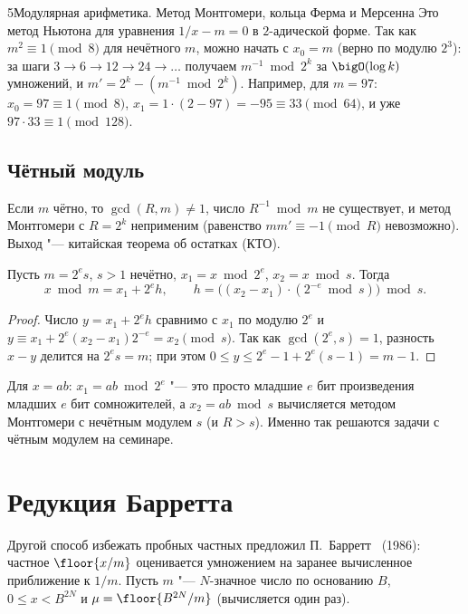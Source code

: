 \begin{lecture}{5}{Модулярная арифметика. Метод Монтгомери, кольца Ферма и Мерсенна}
Это метод Ньютона для уравнения $1/x - m = 0$ в $2$-адической форме. Так как $m^2 \equiv 1
\pmod 8$ для нечётного $m$, можно начать с $x_0 = m$ (верно по модулю $2^3$): за шаги
$3 \to 6 \to 12 \to 24 \to \dots$ получаем $m^{-1} \bmod 2^k$ за $\bigO(\log k)$ умножений, и
$m' = 2^k - (m^{-1} \bmod 2^k)$. Например, для $m = 97$: $x_0 = 97 \equiv 1 \pmod 8$,
$x_1 = 1 \cdot (2 - 97) = -95 \equiv 33 \pmod{64}$, и уже $97 \cdot 33 \equiv 1 \pmod{128}$.

\subsection{Чётный модуль}

Если $m$ чётно, то $\gcd(R, m) \ne 1$, число $R^{-1} \bmod m$ не существует, и метод
Монтгомери с $R = 2^k$ неприменим (равенство $m m' \equiv -1 \pmod R$ невозможно). Выход "---
китайская теорема об остатках (КТО).

\begin{proposition}\label{l5:even}
Пусть $m = 2^e s$, $s > 1$ нечётно, $x_1 = x \bmod 2^e$, $x_2 = x \bmod s$. Тогда
\[
  x \bmod m = x_1 + 2^e h, \qquad h = \bigl((x_2 - x_1) \cdot (2^{-e} \bmod s)\bigr) \bmod s.
\]
\end{proposition}

\begin{proof}
Число $y = x_1 + 2^e h$ сравнимо с $x_1$ по модулю $2^e$ и
$y \equiv x_1 + 2^e (x_2 - x_1) 2^{-e} = x_2 \pmod s$. Так как $\gcd(2^e, s) = 1$, разность
$x - y$ делится на $2^e s = m$; при этом $0 \le y \le 2^e - 1 + 2^e(s - 1) = m - 1$.
\end{proof}

Для $x = ab$: $x_1 = ab \bmod 2^e$ "--- это просто младшие $e$ бит произведения младших $e$ бит
сомножителей, а $x_2 = ab \bmod s$ вычисляется методом Монтгомери с нечётным модулем $s$
(и $R > s$). Именно так решаются задачи с чётным модулем на семинаре.



\section{Редукция Барретта}

Другой способ избежать пробных частных предложил П.~Барретт~\cite{barrett} (1986): частное
$\floor{x/m}$ оценивается умножением на заранее вычисленное приближение к $1/m$.
Пусть $m$ "--- $N$-значное число по основанию $B$, $0 \le x < B^{2N}$ и
$\mu = \floor{B^{2N}/m}$ (вычисляется один раз).


\end{lecture}
